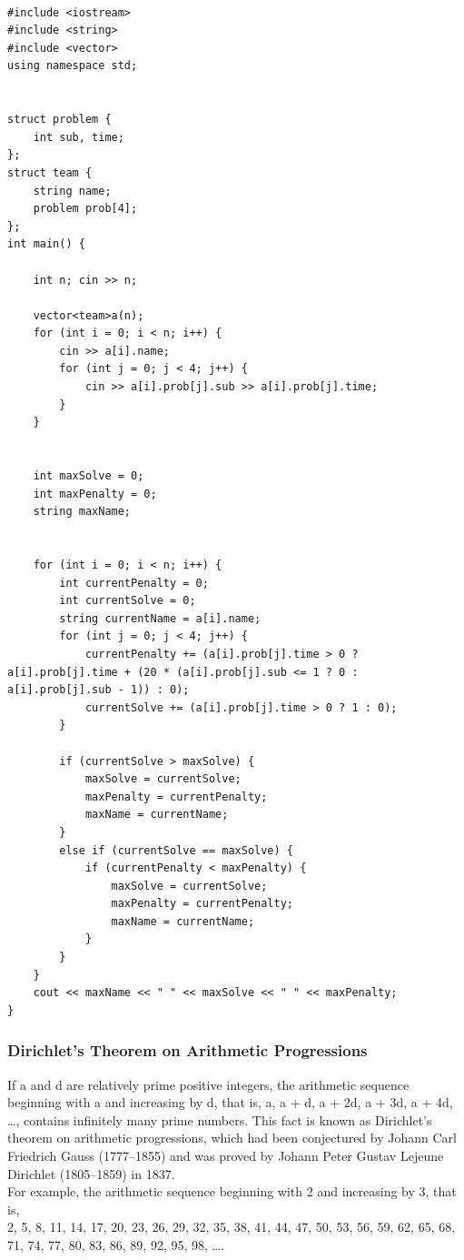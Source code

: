 \documentclass{article}
\begin{document}
\begin{lstlisting}

#include <iostream>
#include <string>
#include <vector>
using namespace std;
	

struct problem {
	int sub, time;
};
struct team {
	string name;
	problem prob[4];
};
int main() {
	
	int n; cin >> n;

	vector<team>a(n);
	for (int i = 0; i < n; i++) {
		cin >> a[i].name;
		for (int j = 0; j < 4; j++) {
			cin >> a[i].prob[j].sub >> a[i].prob[j].time;
		}
	}


	int maxSolve = 0;
	int maxPenalty = 0;
	string maxName;


	for (int i = 0; i < n; i++) {
		int currentPenalty = 0;
		int currentSolve = 0;
		string currentName = a[i].name;
		for (int j = 0; j < 4; j++) {
			currentPenalty += (a[i].prob[j].time > 0 ? a[i].prob[j].time + (20 * (a[i].prob[j].sub <= 1 ? 0 : a[i].prob[j].sub - 1)) : 0);
			currentSolve += (a[i].prob[j].time > 0 ? 1 : 0);
		}

		if (currentSolve > maxSolve) {
			maxSolve = currentSolve;
			maxPenalty = currentPenalty;
			maxName = currentName;
		}
		else if (currentSolve == maxSolve) {
			if (currentPenalty < maxPenalty) {
				maxSolve = currentSolve;
				maxPenalty = currentPenalty;
				maxName = currentName;
			}
		}
	}
	cout << maxName << " " << maxSolve << " " << maxPenalty;
}

\end{lstlisting}


\subsubsection{Dirichlet’s Theorem on Arithmetic Progressions}

If a and d are relatively prime positive integers, the arithmetic sequence beginning with a and increasing by d, that is, a, a +  d, a + 2d, a + 3d, a + 4d, …, contains infinitely many prime numbers. This fact is known as Dirichlet’s theorem on arithmetic progressions, which had been conjectured by Johann Carl Friedrich Gauss (1777–1855) and was proved by Johann Peter Gustav Lejeune Dirichlet (1805–1859) in 1837. \\

For example, the arithmetic sequence beginning with 2 and increasing by 3, that is, \\ 2, 5, 8, 11, 14, 17, 20, 23, 26, 29, 32, 35, 38, 41, 44, 47, 50, 53, 56, 59, 62, 65, 68, 71, 74, 77, 80, 83, 86, 89, 92, 95, 98, …. \\
\end{document}
